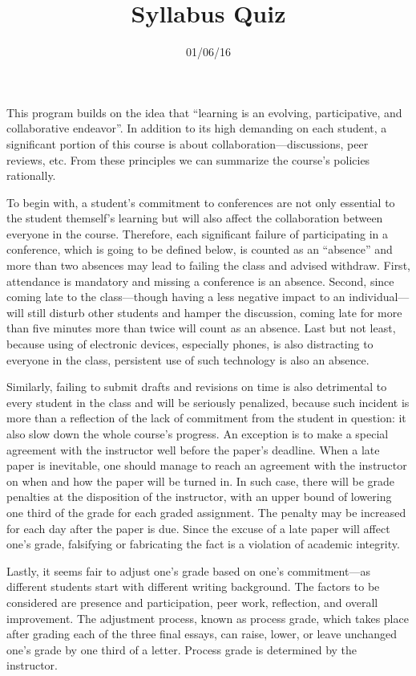 \documentclass{writing}
\title{Syllabus Quiz}
\date{01/06/16}
\begin{document}
\maketitle

This program builds on the idea that “learning is an evolving, participative, and collaborative endeavor”. In addition to its high demanding on each student, a significant portion of this course is about collaboration—discussions, peer reviews, etc. From these principles we can summarize the course’s policies rationally.

To begin with, a student’s commitment to conferences are not only essential to the student themself’s learning but will also affect the collaboration between everyone in the course. Therefore, each significant failure of participating in a conference, which is going to be defined below, is counted as an “absence” and more than two absences may lead to failing the class and advised withdraw. First, attendance is mandatory and missing a conference is an absence. Second, since coming late to the class—though having a less negative impact to an individual—will still disturb other students and hamper the discussion, coming late for more than five minutes more than twice will count as an absence. Last but not  least, because using of electronic devices, especially phones, is also distracting to everyone in the class, persistent use of such technology is also an absence.

Similarly, failing to submit drafts and revisions on time is also detrimental to every student in the class and will be seriously penalized, because such incident is more than a reflection of the lack of commitment from the student in question: it also slow down the whole course’s progress. An exception is to make a special agreement with the instructor well before the paper’s deadline. When a late paper is inevitable, one should manage to reach an agreement with the instructor on when and how the paper will be turned in. In such case, there will be grade penalties at the disposition of the instructor, with an upper bound of lowering one third of the grade for each graded assignment. The penalty may be increased for each day after the paper is due. Since the excuse of a late paper will affect one’s grade, falsifying or fabricating the fact is a violation of academic integrity.

Lastly, it seems fair to adjust one’s grade based on one’s commitment—as different students start with different writing background. The factors to be considered are presence and participation, peer work, reflection, and overall improvement. The adjustment process, known as process grade, which takes place after grading each of the three final essays, can raise, lower, or leave unchanged one’s grade by one third of a letter. Process grade is determined by the instructor.
\end{document}
